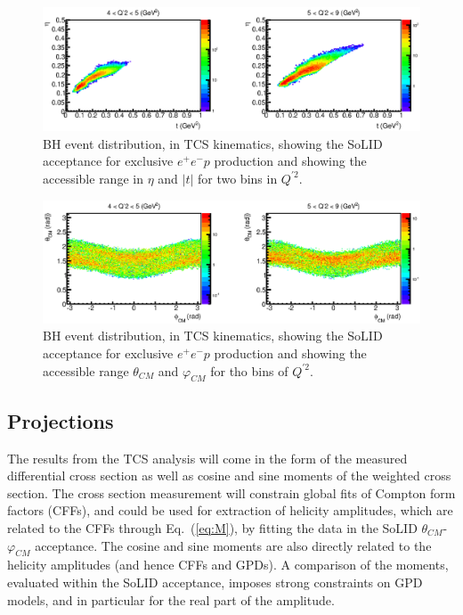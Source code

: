 \begin{figure}[t]
\includegraphics[scale=0.7]{t_eta_Q2bin.eps}
\caption{\small{BH event distribution, in TCS kinematics, showing the SoLID
acceptance for exclusive $e^+e^-p$ production and showing the accessible
range in $\eta$ and $|t|$ for two bins in $Q^{\prime 2}$.}}
\label{fig:t_eta_Q2bin}
\end{figure}

\begin{figure}[t]
\includegraphics[scale=0.7]{theta_phi_CM_Q2bin.eps}
\caption{\small{BH event distribution, in TCS kinematics, showing the SoLID
acceptance for exclusive $e^+e^-p$ production and showing the accessible
range $\theta_{CM}$ and $\varphi_{CM}$ for tho bins of $Q^{\prime 2}$.}}
\label{fig:theta_phi_CM_Q2bin}
\end{figure}


\subsection{Projections}
\label{sec:tcsrate}

The results from the TCS analysis will come in the form of the measured
differential cross section as well as cosine and sine moments of the weighted
cross section. The cross section measurement will constrain global fits of
Compton form factors (CFFs), and could be used for extraction of helicity
amplitudes, which are related to the CFFs through Eq.~(\ref{eq:M}), by fitting
the data in the SoLID $\theta_{CM}$-$\varphi_{CM}$ acceptance.
The cosine and sine moments are also directly related to the helicity
amplitudes (and hence CFFs and GPDs). A comparison of the moments, evaluated
within the SoLID acceptance, imposes strong constraints on GPD models, and in
particular for the real part of the amplitude. 

